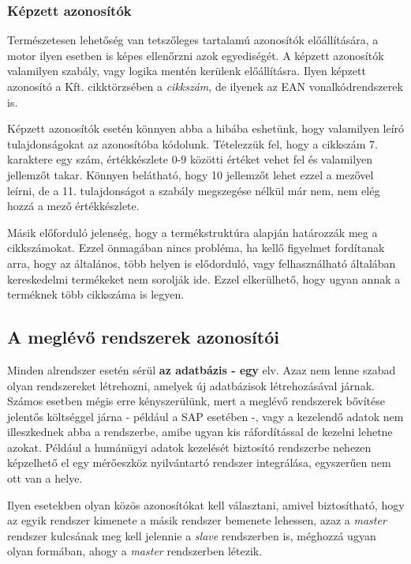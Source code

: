 \documentclass[a4paper,12pt]{report}
\begin{document}
\subsubsection{Képzett azonosítók}
Természetesen lehetőség van tetszőleges tartalamú azonosítók előállítására, a 
motor ilyen esetben is képes ellenőrzni azok egyediségét. A képzett azonosítók 
valamilyen szabály, vagy logika mentén kerülenk előállításra. Ilyen képzett 
azonosító a Kft. cikktörzsében a \textit{cikkszám}, de ilyenek az EAN 
vonalkódrendszerek is.

Képzett azonosítók esetén könnyen abba a hibába eshetünk, hogy valamilyen leíró
tulajdonságokat az azonosítóba kódolunk. Tételezzük fel, hogy a cikkszám 7.
karaktere egy szám, értékkészlete 0-9 közötti értéket vehet fel és valamilyen 
jellemzőt takar. Könnyen belátható, hogy 10 jellemzőt lehet ezzel a mezővel 
leírni, de a 11. tulajdonságot a szabály megszegése nélkül már nem, nem elég 
hozzá a mező értékkészlete.

Másik előforduló jelenség, hogy a termékstruktúra alapján határozzák meg a 
cikkszámokat. Ezzel önmagában nincs probléma, ha kellő figyelmet fordítanak 
arra, hogy az általános, több helyen is elődorduló, vagy felhasználható 
általában kereskedelmi termékeket nem sorolják ide. Ezzel elkerülhető, 
hogy ugyan annak a terméknek több cikkszáma is legyen.

\subsection{A meglévő rendszerek azonosítói}

Minden alrendszer esetén sérül \textbf{az adatbázis - egy} elv. Azaz nem lenne 
szabad olyan rendszereket létrehozni, amelyek új adatbázisok létrehozásával 
járnak. Számos esetben mégis erre kényszerülünk, mert a meglévő rendszerek 
bővítése jelentős költséggel járna - például a SAP esetében -, vagy a kezelendő 
adatok nem illeszkednek abba a rendszerbe, amibe ugyan kis ráfordítással de 
kezelni lehetne azokat. Például a humánügyi adatok kezelését biztosító 
rendszerbe nehezen képzelhető el egy mérőeszköz nyilvántartó rendszer 
integrálása, egyszerűen nem ott van a helye.

Ilyen esetekben olyan közös azonosítókat kell választani, amivel biztosítható,
hogy az egyik rendszer kimenete a másik rendszer bemenete lehessen, azaz a 
\textit{master} rendszer kulcsának meg kell jelennie a \textit{slave} 
rendszerben is, méghozzá ugyan olyan formában, ahogy a \textit{master} 
rendszerben létezik. 
\end{document}
